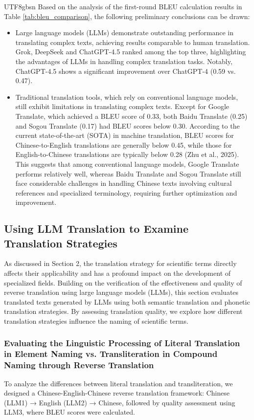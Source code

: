 \documentclass[conference]{IEEEtran}
\begin{document}
\begin{CJK*}{UTF8}{gbsn}
Based on the analysis of the first-round BLEU calculation results in Table \ref{tab:bleu_comparison}, the following preliminary conclusions can be drawn:
\begin{itemize}
 \item Large language models (LLMs) demonstrate outstanding performance in translating complex texts, achieving results comparable to human translation. Grok, DeepSeek and ChatGPT-4.5 ranked among the top three, highlighting the advantages of LLMs in handling complex translation tasks. Notably, ChatGPT-4.5 shows a significant improvement over ChatGPT-4 (0.59 vs. 0.47).
 \item Traditional translation tools, which rely on conventional language models, still exhibit limitations in translating complex texts. Except for Google Translate, which achieved a BLEU score of 0.33, both Baidu Translate (0.25) and Sogou Translate (0.17) had BLEU scores below 0.30. According to the current state-of-the-art (SOTA) in machine translation, BLEU scores for Chinese-to-English translations are generally below 0.45, while those for English-to-Chinese translations are typically below 0.28 (Zhu et al., 2025). This suggests that among conventional language models, Google Translate performs relatively well, whereas Baidu Translate and Sogou Translate still face considerable challenges in handling Chinese texts involving cultural references and specialized terminology, requiring further optimization and improvement. 
\end{itemize}

\subsection{Using LLM Translation to Examine Translation Strategies}
As discussed in Section 2, the translation strategy for scientific terms directly affects their applicability and has a profound impact on the development of specialized fields. Building on the verification of the effectiveness and quality of reverse translation using large language models (LLMs), this section evaluates translated texts generated by LLMs using both semantic translation and phonetic translation strategies. By assessing translation quality, we explore how different translation strategies influence the naming of scientific terms.

\subsubsection{Evaluating the Linguistic Processing of Literal Translation in Element Naming vs. Transliteration in Compound Naming through Reverse Translation}
To analyze the differences between literal translation and transliteration, we designed a Chinese-English-Chinese reverse translation framework: Chinese (LLM1) → English (LLM2) → Chinese, followed by quality assessment using LLM3, where BLEU scores were calculated.


\end{CJK*}
\end{document}
